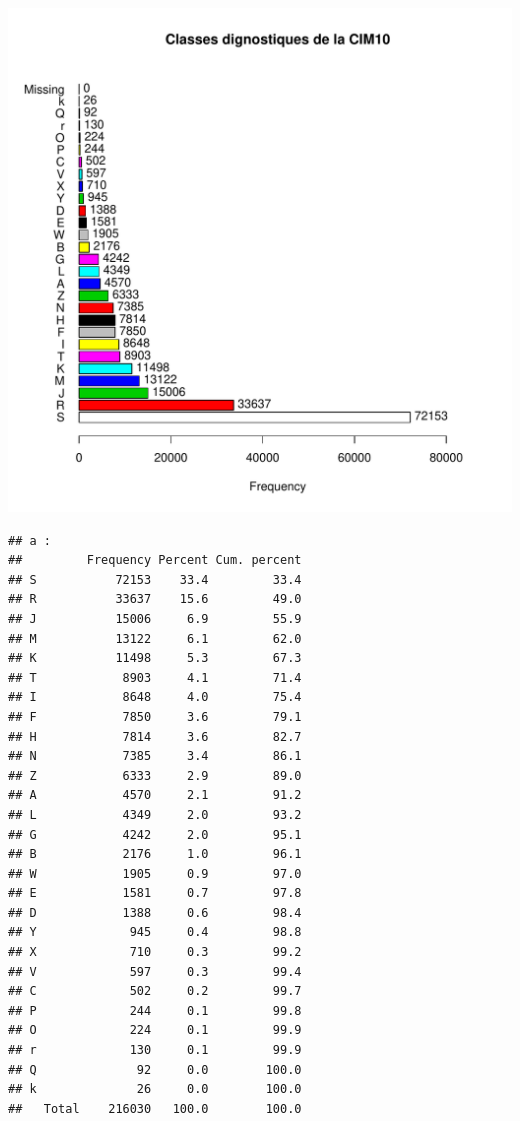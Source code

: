 \documentclass[12pt,english,french,twoside]{report}\usepackage[]{graphicx}\usepackage[]{color}
\makeatletter
\def\maxwidth{ %
  \ifdim\Gin@nat@width>\linewidth
    \linewidth
  \else
    \Gin@nat@width
  \fi
}
\newenvironment{kframe}{%
 \def\at@end@of@kframe{}%
 \ifinner\ifhmode%
  \def\at@end@of@kframe{\end{minipage}}%
  \begin{minipage}{\columnwidth}%
 \fi\fi%
 \def\FrameCommand##1{\hskip\@totalleftmargin \hskip-\fboxsep
 \colorbox{shadecolor}{##1}\hskip-\fboxsep
     \hskip-\linewidth \hskip-\@totalleftmargin \hskip\columnwidth}%
 \MakeFramed {\advance\hsize-\width
   \@totalleftmargin\z@ \linewidth\hsize
   \@setminipage}}%
 {\par\unskip\endMakeFramed%
 \at@end@of@kframe}
\newenvironment{knitrout}{}{} %
\makeatother
\begin{document}
\begin{knitrout}
\color{fgcolor}
\includegraphics[width=\maxwidth]{figure/class_cim10} 
\begin{kframe}\begin{verbatim}
## a :  
##         Frequency Percent Cum. percent
## S           72153    33.4         33.4
## R           33637    15.6         49.0
## J           15006     6.9         55.9
## M           13122     6.1         62.0
## K           11498     5.3         67.3
## T            8903     4.1         71.4
## I            8648     4.0         75.4
## F            7850     3.6         79.1
## H            7814     3.6         82.7
## N            7385     3.4         86.1
## Z            6333     2.9         89.0
## A            4570     2.1         91.2
## L            4349     2.0         93.2
## G            4242     2.0         95.1
## B            2176     1.0         96.1
## W            1905     0.9         97.0
## E            1581     0.7         97.8
## D            1388     0.6         98.4
## Y             945     0.4         98.8
## X             710     0.3         99.2
## V             597     0.3         99.4
## C             502     0.2         99.7
## P             244     0.1         99.8
## O             224     0.1         99.9
## r             130     0.1         99.9
## Q              92     0.0        100.0
## k              26     0.0        100.0
##   Total    216030   100.0        100.0
\end{verbatim}
\end{kframe}
\end{knitrout}
\end{document}
